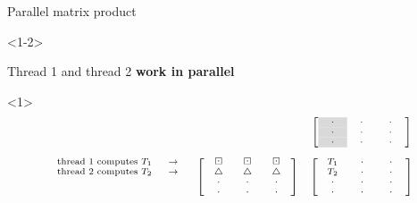 \documentclass[12pt,aspectratio=1610]{beamer}
\begin{document}
\begin{frame}{Parallel matrix product}

\begin{onlyenv}<1-2>

Thread 1 and thread 2 \textbf{work in parallel}

\vspace{-0.3cm}

\begin{onlyenv}<1>
\[
\scriptsize
\begin{array}{ccc}
&& \left[\begin{array}{ccc}
\ \ \cl{\cdot} \ \ & \ \ \cdot \ \  & \ \ \cdot \ \ \\
\ \ \cl{\cdot} \ \ & \ \ \cdot \ \  & \ \ \cdot \ \ \\
\ \ \cl{\cdot} \ \ & \ \ \cdot \ \  & \ \ \cdot \ \ \\
\end{array}\right]\\
\\
\begin{array}{r}
\text{thread 1 computes }T_1 \ \ \ \ \rw\\
\text{thread 2 computes }T_2 \ \ \ \ \rw\\
\\
\\
\end{array}
& \left[\begin{array}{ccc}
\bd & \bd & \bd \\
\uptri & \uptri & \uptri \\
\ \ \cdot \ \ & \ \ \cdot \ \  & \ \ \cdot \ \ \\
\ \ \cdot \ \ & \ \ \cdot \ \  & \ \ \cdot \ \ \\
\end{array}\right]
& \left[\begin{array}{ccc}
\ T_1 \ & \ \ \cdot \ \  & \ \ \cdot \ \ \\
\ T_2 \ & \ \ \cdot \ \  & \ \ \cdot \ \ \\
\ \ \cdot \ \ & \ \ \cdot \ \  & \ \ \cdot \ \ \\
\ \ \cdot \ \ & \ \ \cdot \ \  & \ \ \cdot \ \ \\
\end{array}\right]
\end{array}
\]
\end{onlyenv}


\end{onlyenv}
\end{frame}
\end{document}
